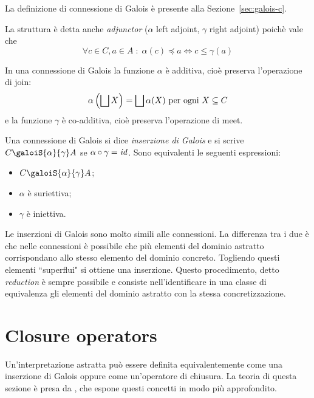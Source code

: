 La definizione di connessione di Galois è presente alla Sezione~\ref{sec:galois-c}.

\begin{theorem}
La struttura è detta anche \emph{adjunctor} ($\alpha$ left adjoint, $\gamma$ right adjoint) poichè vale che
$$\forall c \in C, a \in A \; : \; \alpha(c) \preceq a \Leftrightarrow c \le \gamma(a)$$
\end{theorem}

\begin{theorem}
In una connessione di Galois la funzione $\alpha$ è additiva, cioè preserva l'operazione di join: 
$$\alpha\left(\join[X]\right) = \join[\alpha(X)] \text{ per ogni } X \subseteq C$$
e la funzione $\gamma$ è co-additiva, cioè preserva l'operazione di meet.
\end{theorem}

\begin{definition}
Una connessione di Galois si dice \emph{inserzione di Galois} e si scrive $C \galoiS{\alpha}{\gamma} A$ se $\alpha \circ \gamma = \mathit{id}$. Sono equivalenti le seguenti espressioni:
\begin{itemize}
    \item $C \galoiS{\alpha}{\gamma} A$;
    \item $\alpha$ è suriettiva;
    \item $\gamma$ è iniettiva.
\end{itemize}
\end{definition}

Le inserzioni di Galois sono molto simili alle connessioni. La differenza tra i due è che nelle connessioni è possibile che più elementi del dominio astratto corrispondano allo stesso elemento del dominio concreto. Togliendo questi elementi ``superflui" si ottiene una inserzione. Questo procedimento, detto \emph{reduction} è sempre possibile e consiste nell'identificare in una classe di equivalenza gli elementi del dominio astratto con la stessa concretizzazione.

\section{Closure operators}

Un'interpretazione astratta può essere definita equivalentemente come una inserzione di Galois oppure come un'operatore di chiusura. La teoria di questa sezione è presa da \cite{ranzato}, che espone questi concetti in modo più approfondito. 

